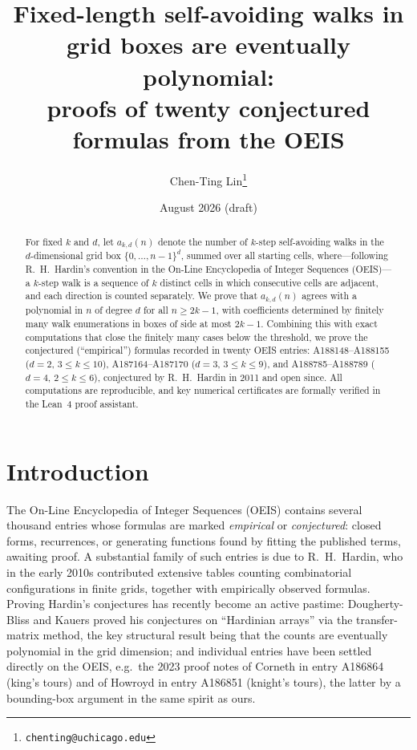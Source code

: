 \documentclass[11pt]{article}
\title{Fixed-length self-avoiding walks in grid boxes are eventually
polynomial:\\ proofs of twenty conjectured formulas from the OEIS}
\author{Chen-Ting Lin\thanks{\texttt{chenting@uchicago.edu}}}
\date{August 2026 (draft)}
\begin{document}
\maketitle

\begin{abstract}
For fixed $k$ and $d$, let $a_{k,d}(n)$ denote the number of $k$-step
self-avoiding walks in the $d$-dimensional grid box
$\{0,\dots,n-1\}^d$, summed over all starting cells, where---following
R.~H.~Hardin's convention in the On-Line Encyclopedia of Integer Sequences
(OEIS)---a $k$-step walk is a sequence of $k$ distinct
cells in which consecutive cells are adjacent, and each direction is
counted separately.  We prove that
$a_{k,d}(n)$ agrees with a polynomial in $n$ of degree $d$ for all
$n \ge 2k-1$, with coefficients determined by finitely many walk
enumerations in boxes of side at most $2k-1$.  Combining this with exact
computations that close the finitely many cases below the threshold, we
prove the conjectured (``empirical'') formulas recorded in twenty OEIS
entries: A188148--A188155 ($d=2$, $3 \le k \le 10$), A187164--A187170
($d=3$, $3 \le k \le 9$), and A188785--A188789 ($d=4$, $2 \le k \le 6$),
conjectured by R.~H.~Hardin in 2011 and open since.  All computations are
reproducible, and key numerical certificates are formally verified in the
Lean~4 proof assistant.
\end{abstract}

\section{Introduction}

The On-Line Encyclopedia of Integer Sequences (OEIS) \cite{OEIS} contains
several thousand entries whose formulas are marked \emph{empirical} or
\emph{conjectured}: closed forms, recurrences, or generating functions
found by fitting the published terms, awaiting proof.  A substantial
family of such entries is due to R.~H.~Hardin, who in the early 2010s
contributed extensive tables counting combinatorial configurations in
finite grids, together with empirically observed formulas.  Proving
Hardin's conjectures has recently become an active pastime:
Dougherty-Bliss and Kauers \cite{DBK} proved his conjectures on
``Hardinian arrays'' via the transfer-matrix method, the key structural
result being that the counts are eventually polynomial in the grid
dimension; and individual entries have been settled directly on the OEIS,
e.g.\ the 2023 proof notes of Corneth in entry A186864 (king's tours) and
of Howroyd in entry A186851 (knight's tours), the latter by a
bounding-box argument in the same spirit as ours.
\end{document}
